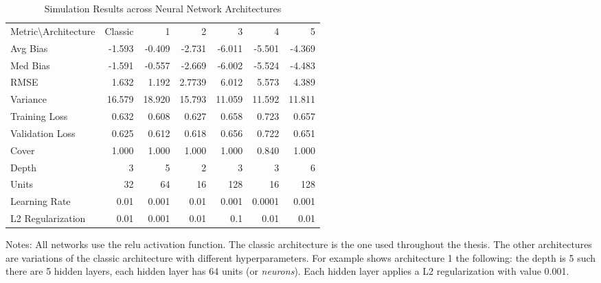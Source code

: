 \begin{table}[ht]
\centering

\begin{threeparttable}
\caption{Simulation Results across Neural Network Architectures}
\label{tab:nn}
\begin{tabular}{lrrrrrr}
    \toprule
\hline
\addlinespace
Metric\textbackslash Architecture & Classic &  1 &  2 &  3 &  4 &  5 \\
\addlinespace
\hline
\addlinespace
Avg Bias & -1.593 & -0.409 & -2.731 & -6.011 & -5.501 &-4.369 \\
Med Bias & -1.591 & -0.557 & -2.669 & -6.002 & -5.524 & -4.483\\
RMSE & 1.632 & 1.192 & 2.7739 &  6.012 &5.573 & 4.389 \\
Variance & 16.579 & 18.920 & 15.793 & 11.059 & 11.592 & 11.811 \\
Training Loss & 0.632 & 0.608 &0.627 &0.658 & 0.723 & 0.657 \\
Validation Loss & 0.625 & 0.612 &  0.618 & 0.656 & 0.722 & 0.651 \\
Cover & 1.000 & 1.000 & 1.000 & 1.000 & 0.840 & 1.000 \\
\addlinespace
\hline
\addlinespace
Depth & 3 & 5 & 2 & 3 & 3 & 6 \\
Units & 32 & 64 & 16 & 128 & 16 & 128 \\
Learning Rate & 0.01 & 0.001 & 0.01 & 0.001 & 0.0001 & 0.001 \\
L2 Regularization & 0.01 & 0.001 & 0.01 & 0.1 & 0.01 & 0.01 \\
\hline
\end{tabular}
\begin{tablenotes}
    \item Notes: All networks use the \ac{relu} activation function. The classic architecture is the one used throughout the thesis. The other architectures are variations of the classic architecture with different hyperparameters. For example shows architecture 1 the following: the depth is 5 such there are 5 hidden layers, each hidden layer has 64 units (or \textit{neurons}). Each hidden layer applies a L2 regularization with value 0.001.
\end{tablenotes}
\end{threeparttable}
\end{table}
